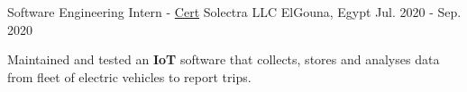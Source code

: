 

\begin{cventries}

   \cventry
     {Software Engineering Intern - \tiny{\href{https://github.com/mido3ds/cv/raw/master/certs/solectra.pdf}{Cert}}} %
     {Solectra LLC} %
     {ElGouna, Egypt} %
     {Jul. 2020 - Sep. 2020} %
     {
       \begin{cvitems} %
       \item{Maintained and tested an \textbf{IoT} software that collects, stores and analyses data from fleet of electric vehicles to report trips.}
       \end{cvitems}
     }

\end{cventries}
